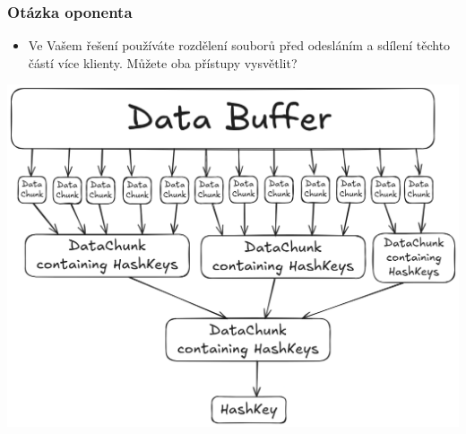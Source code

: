 

\appendix{}
\begin{frame}
  \frametitle{Otázka oponenta}
  \begin{itemize}
    \item Ve Vašem řešení používáte rozdělení souborů před odesláním a sdílení těchto částí více klienty. Můžete
oba přístupy vysvětlit?
  \end{itemize}
\end{frame}

\begin{frame}
  \includegraphics[width=\textwidth]{img/encryption-scheme.png}
\end{frame}

